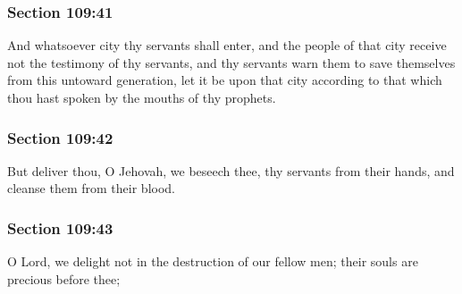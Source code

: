 	\subsubsection{Section 109:41} %
		\label{DC109-41}

		And whatsoever city thy servants shall enter, and the people of that city receive not the testimony of thy servants, and thy servants warn them to save themselves from this untoward generation, let it be upon that city according to that which thou hast spoken by the mouths of thy prophets.


	\subsubsection{Section 109:42} %
		\label{DC109-42}

		But deliver thou, O Jehovah, we beseech thee, thy servants from their hands, and cleanse them from their blood.


	\subsubsection{Section 109:43} %
		\label{DC109-43}

		O Lord, we delight not in the destruction of our fellow men; their souls are precious before thee;


